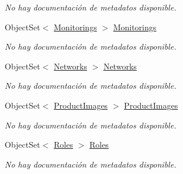 \begin{DoxyCompactItemize}
\begin{DoxyCompactList}\small\item\em No hay documentación de metadatos disponible. \end{DoxyCompactList}\item 
Object\-Set$<$ \hyperlink{class_microsoft_1_1_samples_1_1_kinect_1_1_basic_interactions_1_1_monitorings}{Monitorings} $>$ \hyperlink{class_microsoft_1_1_samples_1_1_kinect_1_1_basic_interactions_1_1_o_m_k_t_d_b_entities_a100bb03b5b9c80556f2ceb10b7006192}{Monitorings}
\begin{DoxyCompactList}\small\item\em No hay documentación de metadatos disponible. \end{DoxyCompactList}\item 
Object\-Set$<$ \hyperlink{class_microsoft_1_1_samples_1_1_kinect_1_1_basic_interactions_1_1_networks}{Networks} $>$ \hyperlink{class_microsoft_1_1_samples_1_1_kinect_1_1_basic_interactions_1_1_o_m_k_t_d_b_entities_a9d61c596791f755a6e5925d31274bbd3}{Networks}
\begin{DoxyCompactList}\small\item\em No hay documentación de metadatos disponible. \end{DoxyCompactList}\item 
Object\-Set$<$ \hyperlink{class_microsoft_1_1_samples_1_1_kinect_1_1_basic_interactions_1_1_product_images}{Product\-Images} $>$ \hyperlink{class_microsoft_1_1_samples_1_1_kinect_1_1_basic_interactions_1_1_o_m_k_t_d_b_entities_aa8331dab05ad7f883c3d07a7100c2faa}{Product\-Images}
\begin{DoxyCompactList}\small\item\em No hay documentación de metadatos disponible. \end{DoxyCompactList}\item 
Object\-Set$<$ \hyperlink{class_microsoft_1_1_samples_1_1_kinect_1_1_basic_interactions_1_1_roles}{Roles} $>$ \hyperlink{class_microsoft_1_1_samples_1_1_kinect_1_1_basic_interactions_1_1_o_m_k_t_d_b_entities_a48fb1fdb8c4d081df5ab21feccd2c2fd}{Roles}
\begin{DoxyCompactList}\small\item\em No hay documentación de metadatos disponible. \end{DoxyCompactList}\item 

\end{DoxyCompactItemize}
